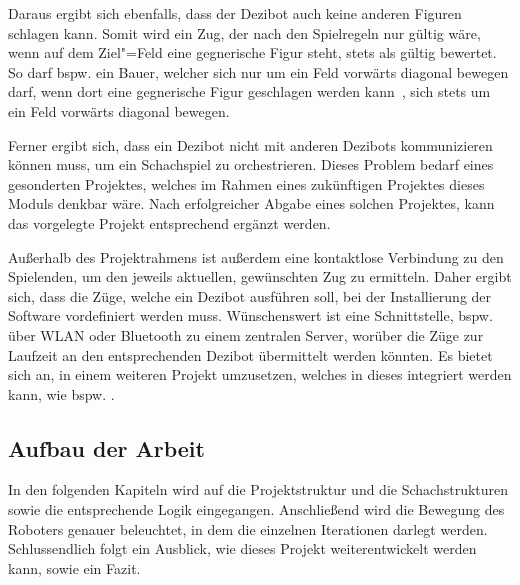 
Daraus ergibt sich ebenfalls, dass der Dezibot auch keine anderen Figuren schlagen kann. Somit wird ein Zug, der nach den Spielregeln nur gültig wäre, wenn auf dem Ziel"=Feld eine gegnerische Figur steht, stets als gültig bewertet. So darf bspw. ein Bauer, welcher sich nur um ein Feld vorwärts diagonal bewegen darf, wenn dort eine gegnerische Figur geschlagen werden kann~\cite{justUSChessFederations2019}, sich stets um ein Feld vorwärts diagonal bewegen.


Ferner ergibt sich, dass ein Dezibot nicht mit anderen Dezibots kommunizieren können muss, um ein Schachspiel zu orchestrieren. Dieses Problem bedarf eines gesonderten Projektes, welches im Rahmen eines zukünftigen Projektes dieses Moduls denkbar wäre. Nach erfolgreicher Abgabe eines solchen Projektes, kann das vorgelegte Projekt entsprechend ergänzt werden.


Außerhalb des Projektrahmens ist außerdem eine kontaktlose Verbindung zu den Spielenden, um den jeweils aktuellen, gewünschten Zug zu ermitteln. Daher ergibt sich, dass die Züge, welche ein Dezibot ausführen soll, bei der Installierung der Software vordefiniert werden muss. Wünschenswert ist eine Schnittstelle, bspw. über WLAN oder Bluetooth zu einem zentralen Server, worüber die Züge zur Laufzeit an den entsprechenden Dezibot übermittelt werden könnten. Es bietet sich an, in einem weiteren Projekt umzusetzen, welches in dieses integriert werden kann, wie bspw. \cite{bruderMoseschmiedelDezibot2025,dietrichTimDietrichDezibotlogging2025,richterCurvesHubDezibotDebugInterface2025}.


\subsection{Aufbau der Arbeit}

In den folgenden Kapiteln wird auf die Projektstruktur und die Schachstrukturen sowie die entsprechende Logik eingegangen. Anschließend wird die Bewegung des Roboters genauer beleuchtet, in dem die einzelnen Iterationen darlegt werden. Schlussendlich folgt ein Ausblick, wie dieses Projekt weiterentwickelt werden kann, sowie ein Fazit.

